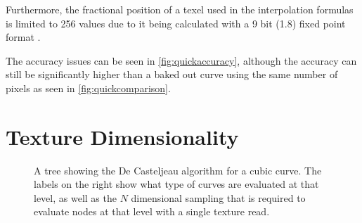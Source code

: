 \documentclass{jcgt}
\begin{document}
Furthermore, the fractional position of a texel used in the interpolation formulas is limited to 256 values due to it being calculated with a 9 bit (1.8) fixed point format \cite{NVIDIA}.

The accuracy issues can be seen in \autoref{fig:quickaccuracy}, although the accuracy can still be significantly higher than a baked out curve using the same number of pixels as seen in \autoref{fig:quickcomparison}.

\section{Texture Dimensionality}
\label{sec:texturedimensionality}

\newcommand*\circled[1]{\tikz[baseline=(char.base)]{
            \node[shape=circle,draw] (char) {#1};}}

\begin{figure}
  \caption{A tree showing the De Casteljeau algorithm for a cubic curve.  The labels on the right show what type of curves are evaluated at that level, as well as the $N$ dimensional sampling that is required to evaluate nodes at that level with a single texture read.}
  \label{fig:decdimensionality}
\end{figure}  
\end{document}
